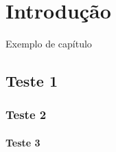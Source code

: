 \chapter{Introdução}

Exemplo de capítulo

\section{Teste 1}
\subsection{Teste 2}
\subsubsection{Teste 3}
